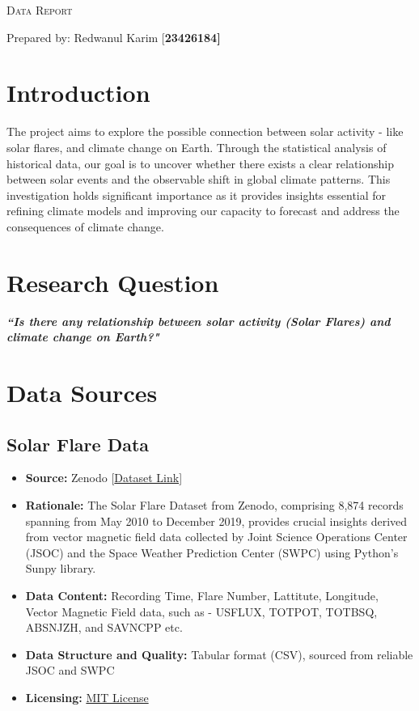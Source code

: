 \documentclass{article}
\begin{document}
\begin{center}
    {\scshape\Large Data Report \par}
    \vspace{0.1cm}
    {\Large Prepared by: Redwanul Karim [\bf{23426184}] \par}
    \vspace{0.1cm} %
\end{center}

\section{Introduction}
The project aims to explore the possible connection between solar activity - like solar flares, and climate change on Earth. Through the statistical analysis of historical data, our goal is to uncover whether there exists a clear relationship between solar events and the observable shift in global climate patterns. This investigation holds significant importance as it provides insights essential for refining climate models and improving our capacity to forecast and address the consequences of climate change. 

\section{Research Question}
\textbf{\textit{``Is there any relationship between solar activity (Solar Flares) and climate change on Earth?"}}

\section{Data Sources}

\subsection{Solar Flare Data}
   \begin{itemize}
       \item \textbf{Source:} Zenodo [\href{https://zenodo.org/records/4603412}{Dataset Link}]
       \item \textbf{Rationale:} The Solar Flare Dataset from Zenodo, comprising 8,874 records spanning from May 2010 to December 2019, provides crucial insights derived from vector magnetic field data collected by Joint Science Operations Center (JSOC) and the Space Weather Prediction Center (SWPC) using Python’s Sunpy library.
       \item \textbf{Data Content:} Recording Time, Flare Number, Lattitute, Longitude, Vector Magnetic Field data, such as - USFLUX, TOTPOT, TOTBSQ, ABSNJZH, and SAVNCPP etc.
       \item \textbf{Data Structure and Quality:} Tabular format (CSV), sourced from reliable JSOC and SWPC 
       \item \textbf{Licensing:} \href{https://opensource.org/license/MIT}{MIT License}
   \end{itemize}
\end{document}
